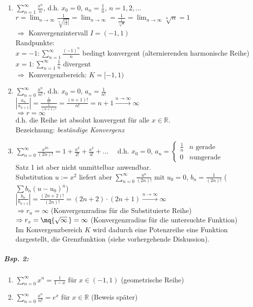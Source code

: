 \begin{enumerate}[label=\alph*.)]
\item $\sum_{n=1}^\infty \frac{x^n}{n}$, d.h. $x_0=0$, $a_n=\frac{1}{n}$, $n=1,2,...$\\
$r= \lim_{n\to\infty} \frac{1}{\sqrt[n]{\left|\frac{1}{n}\right|}}=\lim_{n\to \infty}=\frac{1}{\frac{1}{\sqrt[n]{n}}}=\lim_{n\to\infty}\sqrt[n]{n}=1$\\
$\Rightarrow$ Konvergenzintervall $I=(-1,1)$\\
Randpunkte:\\
$x=-1: \sum_{n=1}^\infty \frac{(-1)^n}{n}$ bedingt konvergent (alternierenden harmonische Reihe)\\
$x=1: \sum_{n=1}^\infty \frac{1}{n}$ divergent\\
$\Rightarrow$ Konvergenzbereich: $K=[-1,1)$
\item $\sum_{n=0}^\infty \frac{x^n}{n!}$, d.h. $x_0=0$, $a_n=\frac{1}{n!}$\\
$\left| \frac{a_n}{a_{n+1}}\right| = \frac{\frac{1}{n!}}{\frac{1}{(n+1)!}}=\frac{(n+1)!}{n!}=n+1\overset{n\to \infty}{\longrightarrow} \infty$\\
$\Rightarrow r = \infty$\\
d.h. die Reihe ist absolut konvergent für alle $x \in \mathbb{R}$.\\
Bezeichnung: \emph{beständige Konvergenz}
\item $\sum_{n=0}^\infty \frac{x^{2n}}{(2n)!}=1+\frac{x^2}{2!}+\frac{x^2}{4!}+...\quad$ d.h. $x_0 = 0$, $a_n=\begin{cases}
\frac{1}{n} & n \text{ gerade}\\
0 & n \text{ungerade}
\end{cases}$\\
Satz 1 ist aber nicht unmittelbar anwendbar.\\
Substitution $u:=x^2$ liefert aber $\sum_{n=0}^\infty \frac{u^n}{(2n)!}$ mit $u_0=0$, $b_n=\frac{1}{(2n)!}$ ($\sum b_n (u-u_0)^n$)\\
$\left| \frac{b_n}{b_{n+1}}\right|=\frac{(2n+2)!}{(2n)!}=(2n+2)\cdot (2n+1) \overset{n\to \infty}{\longrightarrow} \infty$\\
$\Rightarrow r_u=\infty$ (Konvergenzradius für die Substituierte Reihe)\\
$\Rightarrow r_x=\mq{\sqrt{\infty}\,}= \infty$ (Konvergenzradius für die untersuchte Funktion)\\
Im Konvergenzbereich $K$ wird dadurch eine Potenzreihe eine Funktion dargestellt, die Grenzfunktion (siehe vorhergehende Diskussion).
\end{enumerate}
\subparagraph{Bsp. 2:}
\begin{enumerate}[label=\alph*.)]
\item $\sum_{n=0}^\infty x^n = \frac{1}{1-x}$ für $x\in (-1,1)$ (geometrische Reihe)
\item $\sum_{n=0}^\infty \frac{x^n}{n!}=e^x$ für $x\in \mathbb{R}$ (Beweis später)
\end{enumerate}
